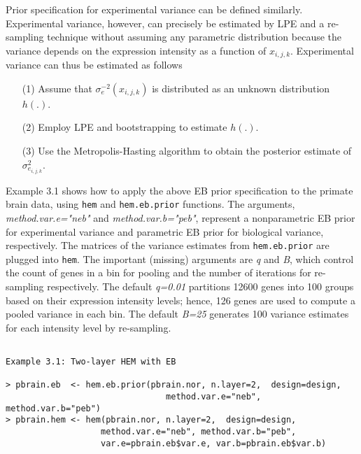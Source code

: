 \documentclass[12pt]{article}
\newcommand{\Rfunction}[1]{{\texttt{#1}}}
\newcommand{\Rfunarg}[1]{{\textit{#1}}}
\begin{document}
Prior specification for experimental variance can be defined similarly.
Experimental variance, however, can precisely be estimated by LPE and a re-sampling technique
without assuming any parametric distribution  
because the variance depends on the expression intensity as a function of $x_{i,j,k}$.
Experimental variance can thus be estimated as follows
\begin{itemize}
     \item[(1)] Assume that $\sigma^{-2}_e (x_{i,j,k})$ is distributed as  an unknown distribution $h(.)$. 
     \item[(2)] Employ LPE  and bootstrapping to estimate $h(.)$.
     \item[(3)] Use the Metropolis-Hasting algorithm to obtain the posterior estimate of $\sigma^2_{e_{i,j,k}}$.
\end{itemize}




Example 3.1 shows how to apply the above EB prior specification to the primate brain data, 
using \Rfunction{hem} and \Rfunction{hem.eb.prior} functions.  
The arguments, \Rfunarg{method.var.e="neb"} and \Rfunarg{method.var.b="peb"}, represent 
a nonparametric EB prior for experimental variance and parametric EB prior for biological variance, respectively.
The matrices of the variance estimates from  \Rfunction{hem.eb.prior} are plugged into \Rfunction{hem}. 
The important (missing) arguments are \Rfunarg{q} and \Rfunarg{B}, which control the count of genes in a bin for pooling
and the number of iterations for re-sampling respectively. 
The default \Rfunarg{q=0.01} partitions 12600 genes into 100 groups based on their expression intensity levels; 
hence, 126 genes are used to compute a pooled variance in each bin.
The default \Rfunarg{B=25} generates 100 variance estimates for each intensity level by re-sampling.

\begin{verbatim}

Example 3.1: Two-layer HEM with EB

> pbrain.eb  <- hem.eb.prior(pbrain.nor, n.layer=2,  design=design,
                                method.var.e="neb", method.var.b="peb")
> pbrain.hem <- hem(pbrain.nor, n.layer=2,  design=design,
                   method.var.e="neb", method.var.b="peb",
                   var.e=pbrain.eb$var.e, var.b=pbrain.eb$var.b)

\end{verbatim}
\end{document}
